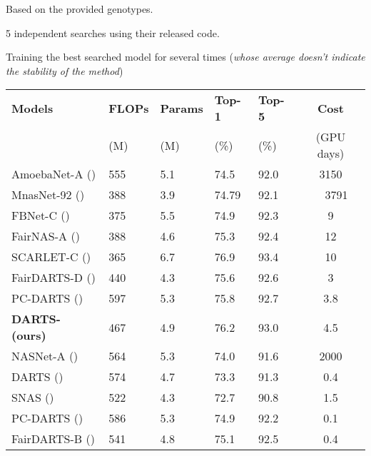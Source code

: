 \documentclass{article} \usepackage{iclr2021_conference,times}
\newcommand{\citeyp}[1]{(\citeyear{#1})}
\begin{document}
\begin{table}[tb!]
\begin{center}
\begin{scriptsize}
\begin{minipage}{0.48\textwidth}
\begin{threeparttable}
\begin{tabular}{*{5}{l}}
				\bottomrule
			\end{tabular}
			\begin{tablenotes}
			\footnotesize
			\item[] Based on the provided genotypes.
			\item[] 5 independent searches using their released code.
			\item[]Training the best searched model for several times (\emph{whose average doesn't indicate the stability of the method})
			\end{tablenotes}
			\end{threeparttable}
			\end{minipage}
			\begin{minipage}{0.5\textwidth}
			\vspace{-2pt}
			\begin{threeparttable}
			\begin{tabular}{*{2}{l}*{3}{l}c} 			
				\toprule
				\textbf{Models} & \textbf{FLOPs}  & \textbf{Params} & \textbf{Top-1} & \textbf{Top-5}  & \textbf{Cost} \\
				& \scriptsize{(M)} & \scriptsize{(M)} & \scriptsize{(\%)} & \scriptsize{(\%)} & \scriptsize{(GPU days)}  \\
\midrule
				AmoebaNet-A \citeyp{real2019regularized} & 555  & 5.1 & 74.5& 92.0& 3150 \\
				MnasNet-92 \citeyp{tan2018mnasnet}  & 388 & 3.9 & 74.79  &92.1& \ \ 3791 \\ 	
				FBNet-C \citeyp{wu2018fbnet}   & 375 & 5.5 &  74.9 & 92.3& 9 \\ 
				FairNAS-A \citeyp{chu2019fairnas} &388 & 4.6 & 75.3 & 92.4 & 12 \\
				SCARLET-C \citeyp{chu2019scarletnas}  & 365 & 6.7 & 76.9 & 93.4 & 10 \\
				FairDARTS-D \citeyp{chu2019fair} & 440 & 4.3 & 75.6& 92.6&3 \\
				PC-DARTS \citeyp{xu2020pcdarts} & 597 & 5.3 & 75.8 & 92.7 & 3.8 \\
				\textbf{DARTS- (ours) }& 467 & 4.9 & 76.2 & 93.0 & 4.5\\
\midrule
				NASNet-A \citeyp{zoph2017learning}  & 564 & 5.3 &74.0 & 91.6& 2000 \\
DARTS \citeyp{liu2018darts} & 574 & 4.7 & 73.3 & 91.3 &0.4 \\
				SNAS \citeyp{xie2018snas}  &522&4.3&72.7 & 90.8&1.5 \\
PC-DARTS  \citeyp{xu2020pcdarts} & 586 & 5.3 & 74.9 & 92.2 &0.1 \\ 
				FairDARTS-B \citeyp{chu2019fair}& 541 & 4.8 &75.1 & 92.5 & 0.4 \\
				


\end{tabular}
\end{threeparttable}
\end{minipage}
\end{scriptsize}
\end{center}
\end{table}
\end{document}
